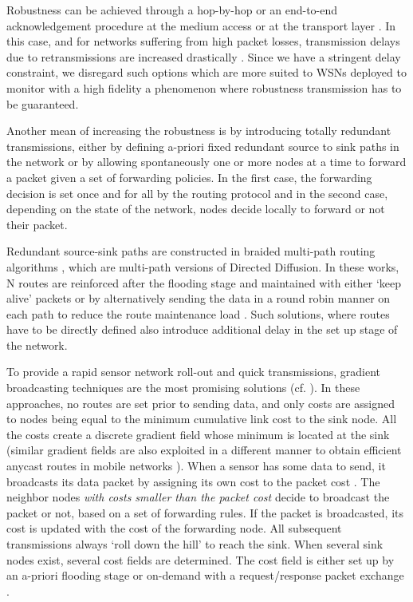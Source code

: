 \documentclass[journal, peerreview, onecolumn, draftcls]{IEEEtran}
\begin{document}
Robustness can be achieved through a hop-by-hop or an end-to-end acknowledgement procedure at the medium access or at the transport layer \cite{Stann03}. In this case, and for networks suffering from high packet losses, transmission delays due to retransmissions are increased drastically \cite{RRZhang}. Since we have a stringent delay constraint, we disregard such options which are more suited to WSNs deployed to monitor with a high fidelity a phenomenon where robustness transmission has to be guaranteed.

Another mean of increasing the robustness is by introducing totally redundant transmissions, either by defining a-priori fixed redundant source to sink paths in the network or by allowing spontaneously one or more nodes at a time to forward a packet given a set of forwarding policies. In the first case, the forwarding decision is set once and for all by the routing protocol and in the second case, depending on the state of the network, nodes decide locally to forward or not their packet.

Redundant source-sink paths are constructed in braided multi-path routing algorithms \cite{ganesan01, bush05}, which are multi-path versions of Directed Diffusion. In these works, N routes are reinforced after the flooding stage and maintained with either `keep alive' packets \cite{ganesan01} or by alternatively sending the data in a round robin manner on each path to reduce the route maintenance load \cite{bush05}. Such solutions, where routes have to be directly defined also introduce additional delay in the set up stage of the network.

To provide a rapid sensor network roll-out and quick transmissions, gradient broadcasting techniques are the most promising solutions (cf. \cite{Maroti04,GRAB05,Chen05,Lim05, Poor}).
In these approaches, no routes are set prior to sending data, and only costs are assigned to nodes being equal to the minimum cumulative link cost to the sink node.
All the costs create a discrete gradient field whose minimum is located at the sink (similar gradient fields are also exploited in a different manner to obtain efficient anycast routes in mobile networks \cite{lenders2006}). When a sensor has some data to send, it broadcasts its data packet by assigning its own cost to the packet cost . The neighbor nodes {\it with costs smaller than the packet cost } decide to broadcast the packet or not, based on a set of forwarding rules. If the packet is broadcasted, its cost  is updated with the cost of the forwarding node. All subsequent transmissions always `roll down the hill' to reach the sink. When several sink nodes exist, several cost fields are determined. The cost field is either set up by an a-priori flooding stage \cite{Maroti04,GRAB01,GRAB05,Lim05} or on-demand with a request/response packet exchange \cite{Poor,Chen05}.
\end{document}
